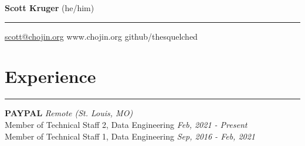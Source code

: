 \documentclass[a4paper,11pt]{article}
\begin{document}
\Huge{\textbf{Scott Kruger}} \hfill \normalsize{(he/him)}
\hrule
\vspace{0.05in}
\normalsize{
    \href{mailto:scott@chojin.org}{scott@chojin.org} 
    \hfill www.chojin.org \hfill github/thesquelched
}

\section*{\huge{Experience}}
\hrule
\vspace{0.1in}

\textbf{PAYPAL} \hfill \textit{Remote (St. Louis, MO)} \\
Member of Technical Staff 2, Data Engineering \hfill \textit{Feb, 2021 - Present} \\
Member of Technical Staff 1, Data Engineering \hfill \textit{Sep, 2016 - Feb, 2021}
\end{document}
